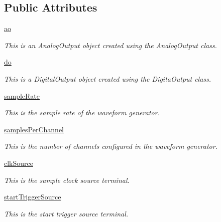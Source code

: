 \subsection*{Public Attributes}
\begin{DoxyCompactItemize}
\item 
\hyperlink{class_waveform_generator_1_1_waveform_generator_ae7ee12ae23b6cf317da47e2580ea1655}{ao}
\begin{DoxyCompactList}\small\item\em This is an Analog\-Output object created using the Analog\-Output class. \end{DoxyCompactList}\item 
\hyperlink{class_waveform_generator_1_1_waveform_generator_a923e4c005cdf1bc1cfdb1cbe33803f40}{do}
\begin{DoxyCompactList}\small\item\em This is a Digital\-Output object created using the Digita\-Output class. \end{DoxyCompactList}\item 
\hyperlink{class_waveform_generator_1_1_waveform_generator_a7f6803ac26eaa8fd4e1880a39c15ca5f}{sample\-Rate}
\begin{DoxyCompactList}\small\item\em This is the sample rate of the waveform generator. \end{DoxyCompactList}\item 
\hyperlink{class_waveform_generator_1_1_waveform_generator_a1800e5e372c200f5241f0ee132b10be3}{samples\-Per\-Channel}
\begin{DoxyCompactList}\small\item\em This is the number of channels configured in the waveform generator. \end{DoxyCompactList}\item 
\hyperlink{class_waveform_generator_1_1_waveform_generator_ae0573744cbc723202afa75c6381e3f71}{clk\-Source}
\begin{DoxyCompactList}\small\item\em This is the sample clock source terminal. \end{DoxyCompactList}\item 
\hyperlink{class_waveform_generator_1_1_waveform_generator_a2eb2105f7a99c224ea725a5fff4c4b39}{start\-Trigger\-Source}
\begin{DoxyCompactList}\small\item\em This is the start trigger source terminal. \end{DoxyCompactList}\item 

\end{DoxyCompactItemize}

